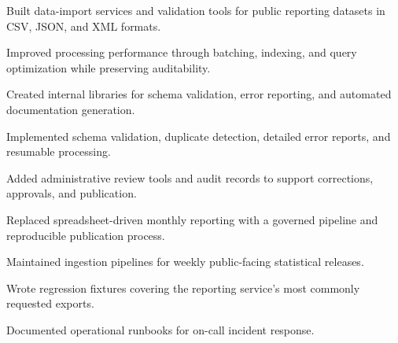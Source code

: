 \documentclass[fontsize=11pt, margin=normal, medium=print]{careerdossier-cv}
\begin{document}
\begin{CDossierEntry}[title = {Engineer}, organization = {Public Data Analytics Incorporated}, location = {Waterloo, ON}, dates = {2016--2019}]
  \begin{CDossierItemize}
    \item Built data-import services and validation tools for public reporting datasets in CSV, JSON, and XML formats.
    \item Improved processing performance through batching, indexing, and query optimization while preserving auditability.
    \item Created internal libraries for schema validation, error reporting, and automated documentation generation.
  \end{CDossierItemize}
\end{CDossierEntry}
\begin{CDossierEntry}[title = {Associate Engineer}, organization = {Regional Data Cooperative}, location = {Kitchener, ON}, dates = {2013--2016}]
  \begin{CDossierItemize}
    \item Implemented schema validation, duplicate detection, detailed error reports, and resumable processing.
    \item Added administrative review tools and audit records to support corrections, approvals, and publication.
    \item Replaced spreadsheet-driven monthly reporting with a governed pipeline and reproducible publication process.
  \end{CDossierItemize}
\end{CDossierEntry}

\begin{CDossierEntry}[title = {Junior Engineer}, organization = {Lakeshore Analytics Group}, location = {Hamilton, ON}, dates = {2011--2013}]
  \begin{CDossierItemize}
    \item Maintained ingestion pipelines for weekly public-facing statistical releases.
    \item Wrote regression fixtures covering the reporting service's most commonly requested exports.
    \item Documented operational runbooks for on-call incident response.
  \end{CDossierItemize}
\end{CDossierEntry}
\end{document}
